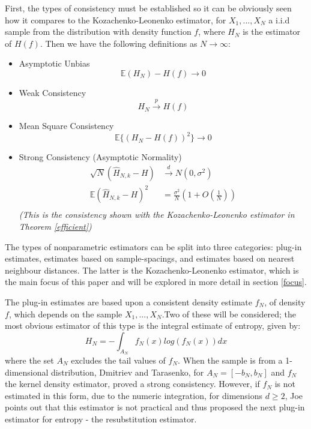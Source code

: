 \documentclass[12pt]{report}
\begin{document}
First, the types of consistency must be established so it can be obviously seen how it compares to the Kozachenko-Leonenko estimator, for $X_{1}, ..., X_{N}$ a i.i.d sample from the distribution with density function $f$, where $H_{N}$ is the estimator of $H(f)$. Then we have the following definitions as $N \to \infty$:
\begin{itemize}

\item Asymptotic Unbias
\begin{equation}
\mathbb{E} (H_{N}) - H(f) \to 0
\end{equation}


\item Weak Consistency 
\begin{equation}
H_{N} \xrightarrow{p} H(f)
\end{equation}

\item Mean Square Consistency
\begin{equation}
\mathbb{E}\{(H_{N} - H(f))^2\} \to 0
\end{equation}

\item Strong Consistency (Asymptotic Normality) 
\begin{align}
\sqrt{N}(\hat{H}_{N, k} - H) &\xrightarrow{d} N(0, \sigma^2) \\
\mathbb{E}{(\hat{H}_{N, k} - H)^2} &= \frac{\sigma^2}{N} \left( 1 + O\left( \frac{1}{N} \right) \right) \\ \nonumber
\end{align}
\textit{(This is the consistency shown with the Kozachenko-Leonenko estimator in Theorem \ref{efficient})}

\end{itemize}

The types of nonparametric estimators can be split into three categories: plug-in estimates, estimates based on sample-spacings, and estimates based on nearest neighbour distances. The latter is the Kozachenko-Leonenko estimator, which is the main focus of this paper and will be explored in more detail in section \ref{focus}.

The plug-in estimates \cite{paper10, paper7} are based upon a consistent density estimate $f_{N}$, of density $f$, which depends on the sample $X_{1}, ..., X_{N}$.Two of these will be considered; the most obvious estimator of this type is the integral estimate of entropy, given by:
\begin{equation}
H_{N} = - \int_{A_{N}} f_{N}(x) log ( f_{N}(x) )dx
\end{equation}
where the set $A_{N}$ excludes the tail values of $f_{N}$. When the sample is from a 1-dimensional distribution, Dmitriev and Tarasenko, \cite{intest1} for $A_{N} = [-b_{N}, b_{N}]$ and $f_{N}$ the kernel density estimator, proved a strong consistency. However, if $f_{N}$ is not estimated in this form, due to the numeric integration, for dimensions $d \geq 2$, Joe \cite{intest2} points out that this estimator is not practical and thus proposed the next plug-in estimator for entropy - the resubstitution estimator.
\end{document}
